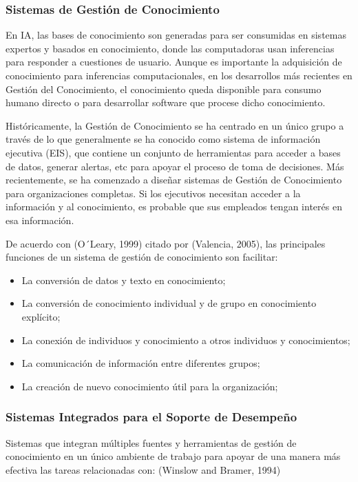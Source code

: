 %

\subsubsection{Sistemas de Gestión de Conocimiento}

En IA, las bases de conocimiento son generadas para ser consumidas en sistemas expertos y basados en conocimiento, donde las computadoras usan inferencias para responder a cuestiones de usuario. Aunque es importante la adquisición de conocimiento para inferencias computacionales, en los desarrollos más recientes en Gestión del Conocimiento, el conocimiento queda disponible para consumo humano directo o para desarrollar software que procese dicho conocimiento. 

Históricamente, la Gestión de Conocimiento se ha centrado en un único grupo a través de lo que generalmente se ha conocido como sistema de información ejecutiva (EIS), que contiene un conjunto de herramientas para acceder a bases de datos, generar alertas, etc para apoyar el proceso de toma de decisiones. Más recientemente, se ha comenzado a diseñar sistemas de Gestión de Conocimiento para organizaciones completas. Si los ejecutivos necesitan acceder a la información y al conocimiento, es probable que sus empleados tengan interés en esa información.
 
De acuerdo con (O´Leary, 1999) citado por (Valencia, 2005), las principales funciones de un sistema de gestión de conocimiento son facilitar:

\begin{itemize}
\item La conversión de datos y texto en conocimiento;
\item La conversión de conocimiento individual y de grupo en conocimiento explícito;
\item La conexión de individuos y conocimiento a otros individuos y conocimientos;
\item La comunicación de información entre diferentes grupos;
\item La creación de nuevo conocimiento útil para la organización;
\end{itemize}

\subsubsection{Sistemas Integrados para el Soporte de Desempeño}

Sistemas que integran múltiples fuentes y herramientas de gestión de conocimiento en un único ambiente de trabajo para apoyar de una manera más efectiva las tareas relacionadas con: (Winslow and Bramer, 1994)

